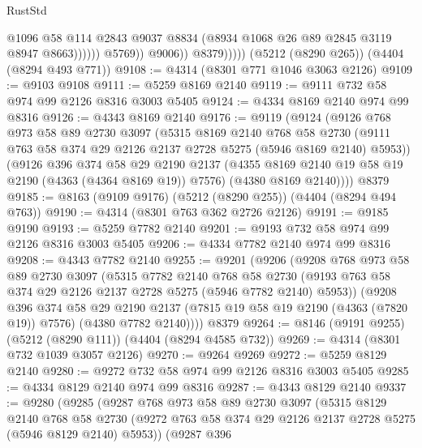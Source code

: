 \begin{lexlean}{RustStd}
\begin{coremodule}
{\begin{coremodule}
{{{{{{{{{{{{{{{{                                @1096
                                @58
                                @114
                                @2843
                                @9037
                                @8834
                                (@8934 @1068 @26 @89 @2845 @3119 @8947 @8663))))))
                      @5769))
                  @9006))
              @8379)))))
    (@5212 (@8290 @265))
    (@4404 (@8294 @493 @771))
@9108 := @4314 (@8301 @771 @1046 @3063 @2126)
@9109 := @9103 @9108
@9111 := @5259 @8169 @2140
@9119 := @9111 @732 @58 @974 @99 @2126 @8316 @3003 @5405
@9124 := @4334 @8169 @2140 @974 @99 @8316
@9126 := @4343 @8169 @2140
@9176 := @9119
    (@9124
      (@9126
        @768
        @973
        @58
        @89
        @2730
        @3097
        (@5315
          @8169
          @2140
          @768
          @58
          @2730
          (@9111 @763 @58 @374 @29 @2126 @2137 @2728 @5275 (@5946 @8169 @2140) @5953))
        (@9126
          @396
          @374
          @58
          @29
          @2190
          @2137
          (@4355 @8169 @2140 @19 @58 @19 @2190 (@4363 (@4364 @8169 @19)) @7576)
          (@4380 @8169 @2140))))
    @8379
@9185 := @8163 (@9109 @9176) (@5212 (@8290 @255)) (@4404 (@8294 @494 @763))
@9190 := @4314 (@8301 @763 @362 @2726 @2126)
@9191 := @9185 @9190
@9193 := @5259 @7782 @2140
@9201 := @9193 @732 @58 @974 @99 @2126 @8316 @3003 @5405
@9206 := @4334 @7782 @2140 @974 @99 @8316
@9208 := @4343 @7782 @2140
@9255 := @9201
    (@9206
      (@9208
        @768
        @973
        @58
        @89
        @2730
        @3097
        (@5315
          @7782
          @2140
          @768
          @58
          @2730
          (@9193 @763 @58 @374 @29 @2126 @2137 @2728 @5275 (@5946 @7782 @2140) @5953))
        (@9208
          @396
          @374
          @58
          @29
          @2190
          @2137
          (@7815 @19 @58 @19 @2190 (@4363 (@7820 @19)) @7576)
          (@4380 @7782 @2140))))
    @8379
@9264 := @8146 (@9191 @9255) (@5212 (@8290 @111)) (@4404 (@8294 @4585 @732))
@9269 := @4314 (@8301 @732 @1039 @3057 @2126)
@9270 := @9264 @9269
@9272 := @5259 @8129 @2140
@9280 := @9272 @732 @58 @974 @99 @2126 @8316 @3003 @5405
@9285 := @4334 @8129 @2140 @974 @99 @8316
@9287 := @4343 @8129 @2140
@9337 := @9280
    (@9285
      (@9287
        @768
        @973
        @58
        @89
        @2730
        @3097
        (@5315
          @8129
          @2140
          @768
          @58
          @2730
          (@9272 @763 @58 @374 @29 @2126 @2137 @2728 @5275 (@5946 @8129 @2140) @5953))
        (@9287
          @396
}}}}}}}}}}}}}}}}
\end{coremodule}}
\end{coremodule}
\end{lexlean}
